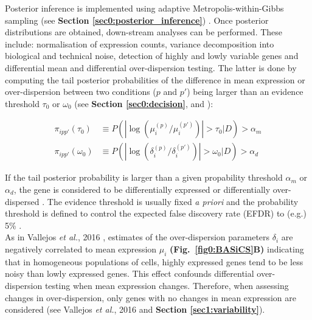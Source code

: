 Posterior inference is implemented using adaptive Metropolis-within-Gibbs sampling (see \textbf{Section \ref{sec0:posterior_inference}}) \citep{Vallejos2015BASiCS, Vallejos2016}. Once posterior distributions are obtained, down-stream analyses can be performed. These include: normalisation of expression counts, variance decomposition into biological and technical noise, detection of highly and lowly variable genes and differential mean and differential over-dispersion testing. The latter is done by computing the tail posterior probabilities of the difference in mean expression or over-dispersion between two conditions ($p$ and $p'$) being larger than an evidence threshold $\tau_0$ or $\omega_0$ (see \textbf{Section \ref{sec0:decision}}, and \citep{Bochkina2007, Vallejos2016}):

\begin{align*}
\pi_{ipp'}(\tau_0)&\equiv{}P(|\log(\mu_i^{(p)}/\mu_i^{(p')})|>\tau_0|D)>\alpha_m\\
\pi_{ipp'}(\omega_0)&\equiv{}P(|\log(\delta_i^{(p)}/\delta_i^{(p')})|>\omega_0|D)>\alpha_d
\end{align*}

If the tail posterior probability is larger than a given propability threshold $\alpha_m$ or $\alpha_d$, the gene is considered to be differentially expressed or differentially over-dispersed \citep{Vallejos2016}. The evidence threshold is usually fixed \emph{a priori} and the probability threshold is defined to control the expected false discovery rate (EFDR) to (e.g.) 5\% \cite{Newton2004, Vallejos2016}.\\

As in Vallejos \emph{et al.}, 2016 \citep{Vallejos2016}, estimates of the over-dispersion parameters $\delta_i$ are negatively correlated to mean expression $\mu_i$ \textbf{(Fig.~\ref{fig0:BASiCS}B)} indicating that in homogeneous populations of cells, highly expressed genes tend to be less noisy than lowly expressed genes. This effect confounds differential over-dispersion testing when mean expression changes. Therefore, when assessing changes in over-dispersion, only genes with no changes in mean expression are considered (see Vallejos \emph{et al.}, 2016 \citep{Vallejos2016} and \textbf{Section \ref{sec1:variability}}).  
